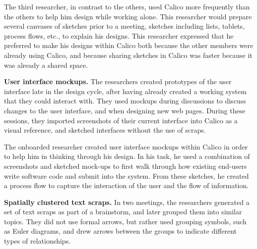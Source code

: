 
The third researcher, in contrast to the others, used Calico more frequently than the others to help him design while working alone. This researcher would prepare several canvases of sketches prior to a meeting, sketches including lists, tablets, process flows, etc., to explain his designs. This researcher expressed that he preferred to make his designs within Calico both because the other members were already using Calico, and because sharing sketches in Calico was faster because it was already a shared space.

%
%
%

\textbf{User interface mockups. } The researchers created prototypes of the user interface late in the design cycle, after having already created a working system that they could interact with. They used mockups during discussions to discuss changes to the user interface, and when designing new web pages. During these sessions, they imported screenshots of their current interface into Calico as a visual reference, and sketched interfaces without the use of scraps.

The onboarded researcher created user interface mockups within Calico in order to help him in thinking through his design. In his task, he used a combination of screenshots and sketched mock-ups to first walk through how existing end-users write software code and submit into the system. From these sketches, he created a process flow to capture the interaction of the user and the flow of information.

%


\textbf{Spatially clustered text scraps. } In two meetings, the researchers generated a set of text scraps as part of a brainstorm, and later grouped them into similar topics. They did not use formal arrows, but rather used grouping symbols, such as Euler diagrams, and drew arrows between the groups to indicate different types of relationships. 

